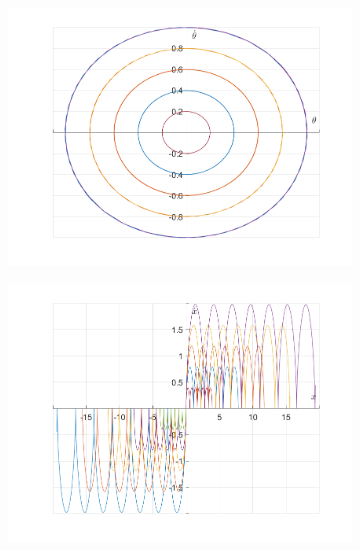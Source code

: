 \documentclass{article}
\begin{document}
	\begin{figure}[h!]
		\centering
		\begin{subfigure}[b]{0.48\linewidth}
			\includegraphics[width=\linewidth]{./SmallOscillations/S9/F5.png}
		\end{subfigure}
		\begin{subfigure}[b]{0.48\linewidth}
			\includegraphics[width=\linewidth]{./SmallOscillations/S9/F6.png}
		\end{subfigure}
	\end{figure}
	\newpage
	
\end{document}
